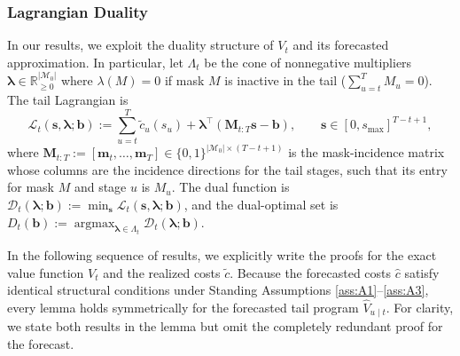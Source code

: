 \documentclass{uai2026} %
\newcommand{\R}{\mathbb{R}}
\newcommand{\1}{\mathbf{1}}
\newcommand{\mcal}{\mathcal{M}}
\newcommand{\argmax}{\operatorname*{argmax}}
\begin{document}
\subsubsection{Lagrangian Duality}
\label{subsec:duality}

In our results, we exploit the duality structure of $V_t$ and its forecasted approximation. In particular, let $\Lambda_t$ be the cone of nonnegative multipliers $\boldsymbol{\lambda} \in \R_{\ge 0}^{|\mcal_{0}|}$ where $\lambda(M)=0$ if mask $M$ is inactive in the tail ($\sum_{u=t}^T M_u = 0$).
The tail Lagrangian is
\begin{equation*}
  \mathcal{L}_t(\mathbf{s},\boldsymbol{\lambda};\mathbf{b})
  :=
  \sum_{u=t}^{T} \tilde{c}_u(s_u)
  + \boldsymbol{\lambda}^\top (\mathbf{M}_{t:T} \mathbf{s} - \mathbf{b}),
  \qquad \mathbf{s} \in [0,s_{\max}]^{T-t+1},
\end{equation*}
where $\mathbf{M}_{t:T} := [\mathbf{m}_t, \dots, \mathbf{m}_T] \in \{0,1\}^{|\mcal_{0}| \times (T-t+1)}$ is the mask-incidence matrix whose columns are the incidence directions for the tail stages, such that its entry for mask $M$ and stage $u$ is $M_u$.
The dual function is $\mathcal{D}_t(\boldsymbol{\lambda};\mathbf{b}) := \min_{\mathbf{s}} \mathcal{L}_t(\mathbf{s},\boldsymbol{\lambda};\mathbf{b})$, and the dual-optimal set is $D_t(\mathbf{b}) := \argmax_{\boldsymbol{\lambda} \in \Lambda_t} \mathcal{D}_t(\boldsymbol{\lambda};\mathbf{b})$.

In the following sequence of results, we explicitly write the proofs for the exact value function $V_t$ and the realized costs $\tilde{c}$. Because the forecasted costs $\hat{c}$ satisfy identical structural conditions under Standing Assumptions \ref{ass:A1}--\ref{ass:A3}, every lemma holds symmetrically for the forecasted tail program $\hat{V}_{u \mid t}$. For clarity, we state both results in the lemma but omit the completely redundant proof for the forecast.
\end{document}
